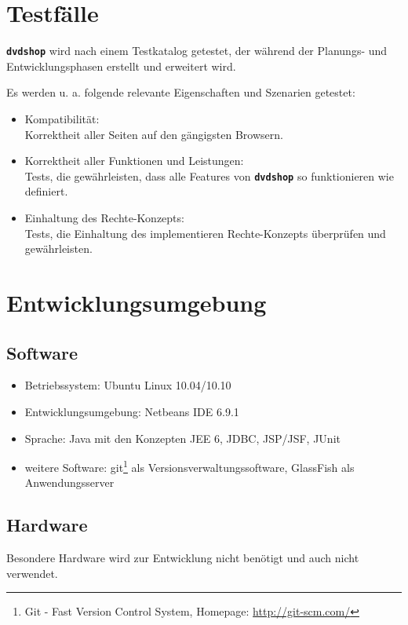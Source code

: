 \documentclass[12pt,oneside,a4paper,bibtotoc,liststotoc,pointlessnumbers]{scrartcl}
\begin{document}
\newpage
\section{Testfälle}
\texttt{\textbf{dvdshop}} wird nach einem Testkatalog getestet, der während der Planungs- und Entwicklungsphasen erstellt und erweitert wird.\par
Es werden u. a. folgende relevante Eigenschaften und Szenarien getestet:
\begin{itemize}
\item Kompatibilität: \\Korrektheit aller Seiten auf den gängigsten Browsern.
\item Korrektheit aller Funktionen und Leistungen: \\Tests, die gewährleisten, dass alle Features von \texttt{\textbf{dvdshop}} so funktionieren wie definiert.
\item Einhaltung des Rechte-Konzepts: \\Tests, die Einhaltung des implementieren Rechte-Konzepts überprüfen und gewährleisten.
\end{itemize}

\newpage
\section{Entwicklungsumgebung}
\subsection{Software}
\begin{itemize}
\item Betriebssystem: Ubuntu Linux 10.04/10.10
\item Entwicklungsumgebung: Netbeans IDE 6.9.1
\item Sprache: Java mit den Konzepten JEE 6, JDBC, JSP/JSF, JUnit
\item weitere Software: git\footnote{Git - Fast Version Control System, Homepage: \url{http://git-scm.com/}} als Versionsverwaltungssoftware, GlassFish als Anwendungsserver
\end{itemize}
\subsection{Hardware}
Besondere Hardware wird zur Entwicklung nicht benötigt und auch nicht verwendet.

\newpage

\end{document}
